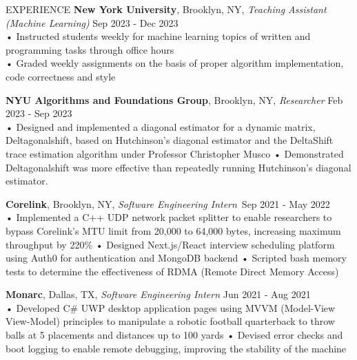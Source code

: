 \documentclass{resume} %
\begin{document}
\begin{rSection}{EXPERIENCE}
\textbf{New York University}, Brooklyn, NY, {\emph{Teaching Assistant (Machine Learning)}} \hfill Sep 2023 - Dec 2023 \\
• Instructed students weekly for machine learning topics of written and programming tasks through office hours \\
• Graded weekly assignments on the basis of proper algorithm implementation, code correctness and style 

\textbf {NYU Algorithms and Foundations Group}, Brooklyn, NY, {\emph{Researcher}} \hfill Feb 2023 - Sep 2023 \\
• Designed and implemented a diagonal estimator for a dynamic matrix, Deltagonalshift, based on Hutchinson's diagonal estimator and the DeltaShift trace estimation algorithm under Professor Christopher Musco \newline
• Demonstrated Deltagonalshift was more effective than repeatedly running Hutchinson's diagonal estimator. 


\textbf{Corelink}, Brooklyn, NY, {\emph{Software Engineering Intern}}\ \hfill Sep 2021 - May 2022 \\
• Implemented a C++ UDP network packet splitter to enable researchers to bypass Corelink's MTU limit from 20,000 to 64,000 bytes, increasing maximum throughput by 220\% \newline
• Designed Next.js/React interview scheduling platform using Auth0 for authentication and MongoDB backend \newline
• Scripted bash memory tests to determine the effectiveness of RDMA (Remote Direct Memory Access) 

\textbf{Monarc}, Dallas, TX, {\emph{Software Engineering Intern}} \hfill Jun 2021 - Aug 2021 \\
• Developed C\# UWP desktop application pages using MVVM (Model-View View-Model) principles to manipulate a robotic football quarterback to throw balls at 5 placements and distances up to 100 yards \newline
• Devised error checks and boot logging to enable remote debugging, improving the stability of the machine \smallskip
\end{rSection} 
\end{document}
